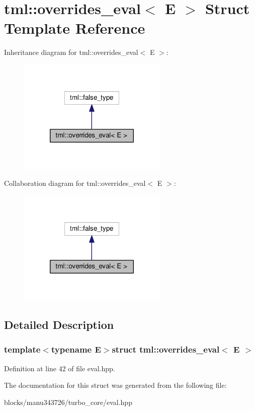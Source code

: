 \hypertarget{structtml_1_1overrides__eval}{\section{tml\+:\+:overrides\+\_\+eval$<$ E $>$ Struct Template Reference}
\label{structtml_1_1overrides__eval}
}


Inheritance diagram for tml\+:\+:overrides\+\_\+eval$<$ E $>$\+:
\nopagebreak
\begin{figure}[H]
\begin{center}
\leavevmode
\includegraphics[width=202pt]{structtml_1_1overrides__eval__inherit__graph}
\end{center}
\end{figure}


Collaboration diagram for tml\+:\+:overrides\+\_\+eval$<$ E $>$\+:
\nopagebreak
\begin{figure}[H]
\begin{center}
\leavevmode
\includegraphics[width=202pt]{structtml_1_1overrides__eval__coll__graph}
\end{center}
\end{figure}


\subsection{Detailed Description}
\subsubsection*{template$<$typename E$>$struct tml\+::overrides\+\_\+eval$<$ E $>$}



Definition at line 42 of file eval.\+hpp.



The documentation for this struct was generated from the following file\+:\begin{DoxyCompactItemize}
\item 
blocks/manu343726/turbo\+\_\+core/eval.\+hpp\end{DoxyCompactItemize}
